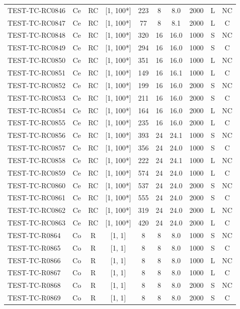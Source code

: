 \begin{longtable}{lccccccccc}
TEST-TC-RC0846 & Ce & RC & [1, 100*] & 223 & 8 & 8.0 & 2000 & L & NC \\
TEST-TC-RC0847 & Ce & RC & [1, 100*] & 77 & 8 & 8.1 & 2000 & L & C \\
TEST-TC-RC0848 & Ce & RC & [1, 100*] & 320 & 16 & 16.0 & 1000 & S & NC \\
TEST-TC-RC0849 & Ce & RC & [1, 100*] & 294 & 16 & 16.0 & 1000 & S & C \\
TEST-TC-RC0850 & Ce & RC & [1, 100*] & 351 & 16 & 16.0 & 1000 & L & NC \\
TEST-TC-RC0851 & Ce & RC & [1, 100*] & 149 & 16 & 16.1 & 1000 & L & C \\
TEST-TC-RC0852 & Ce & RC & [1, 100*] & 199 & 16 & 16.0 & 2000 & S & NC \\
TEST-TC-RC0853 & Ce & RC & [1, 100*] & 211 & 16 & 16.0 & 2000 & S & C \\
TEST-TC-RC0854 & Ce & RC & [1, 100*] & 164 & 16 & 16.0 & 2000 & L & NC \\
TEST-TC-RC0855 & Ce & RC & [1, 100*] & 235 & 16 & 16.0 & 2000 & L & C \\
TEST-TC-RC0856 & Ce & RC & [1, 100*] & 393 & 24 & 24.1 & 1000 & S & NC \\
TEST-TC-RC0857 & Ce & RC & [1, 100*] & 356 & 24 & 24.0 & 1000 & S & C \\
TEST-TC-RC0858 & Ce & RC & [1, 100*] & 222 & 24 & 24.1 & 1000 & L & NC \\
TEST-TC-RC0859 & Ce & RC & [1, 100*] & 574 & 24 & 24.0 & 1000 & L & C \\
TEST-TC-RC0860 & Ce & RC & [1, 100*] & 537 & 24 & 24.0 & 2000 & S & NC \\
TEST-TC-RC0861 & Ce & RC & [1, 100*] & 555 & 24 & 24.0 & 2000 & S & C \\
TEST-TC-RC0862 & Ce & RC & [1, 100*] & 319 & 24 & 24.0 & 2000 & L & NC \\
TEST-TC-RC0863 & Ce & RC & [1, 100*] & 420 & 24 & 24.0 & 2000 & L & C \\
TEST-TC-R0864 & Co & R & [1, 1] & 8 & 8 & 8.0 & 1000 & S & NC \\
TEST-TC-R0865 & Co & R & [1, 1] & 8 & 8 & 8.0 & 1000 & S & C \\
TEST-TC-R0866 & Co & R & [1, 1] & 8 & 8 & 8.0 & 1000 & L & NC \\
TEST-TC-R0867 & Co & R & [1, 1] & 8 & 8 & 8.0 & 1000 & L & C \\
TEST-TC-R0868 & Co & R & [1, 1] & 8 & 8 & 8.0 & 2000 & S & NC \\
TEST-TC-R0869 & Co & R & [1, 1] & 8 & 8 & 8.0 & 2000 & S & C \\

\end{longtable}

